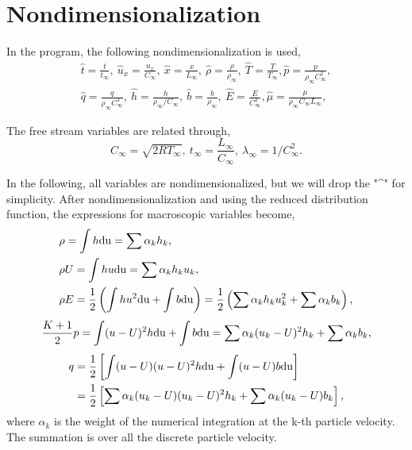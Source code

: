 \documentclass[a4paper]{book}
\begin{document}
\section{Nondimensionalization}
In the program, the following nondimensionalization is used,
\begin{gather*}
    \hat t=\frac{t}{t_\infty},\ \hat u_x=\frac{u_x}{C_\infty},\ \hat x=\frac{x}{L_\infty},\ \hat \rho=\frac{\rho}{\rho_\infty},\ \hat T=\frac{T}{T_\infty}, \hat p=\frac{p}{\rho_\infty C_\infty^2}, \\
    \hat q=\frac{q}{\rho_\infty C_\infty^3},\ \hat h=\frac{h}{\rho_\infty/C_\infty},\ \hat b=\frac{b}{\rho_\infty},\ \hat E=\frac{E}{C_\infty^2}, \hat\mu = \frac{\mu}{\rho_\infty C_\infty L_\infty},
\end{gather*}

The free stream variables are related through,
$$C_\infty=\sqrt{2RT_\infty},\ t_\infty=\frac{L_\infty}{C_\infty},\ \lambda_\infty=1/C_\infty^2.$$

In the following, all variables are nondimensionalized, but we will drop the "\textasciicircum" for simplicity. After nondimensionalization and using the reduced distribution function, the expressions for macroscopic variables become,
\begin{equation} 
    \label{eq:conserved_var}
    \begin{aligned}
        &\rho=\int h{\rm du}=\sum\alpha_k h_k,\\
        &\rho U=\int hu{\rm du}=\sum\alpha_k h_k u_k,\\
        &\rho E=\frac{1}{2}\left(\int hu^2{\rm du}+\int b{\rm du}\right)=\frac{1}{2}\left(\sum\alpha_k h_k u_k^2+\sum\alpha_k b_k\right),
    \end{aligned}
\end{equation}
\begin{equation} 
    \frac{K+1}{2}p=\int(u-U)^2h{\rm du}+\int b{\rm du}=\sum\alpha_k(u_k-U)^2 h_k+\sum\alpha_k b_k,
\end{equation}
\begin{equation} 
    \label{eq:heatflux}
    \begin{aligned}
        q&=\frac{1}{2}\left[\int(u-U)(u-U)^2h{\rm du}+\int(u-U)b{\rm du}\right]\\
         &=\frac{1}{2}\left[\sum\alpha_k (u_k-U)(u_k-U)^2 h_k+\sum\alpha_k (u_k-U)b_k\right],
    \end{aligned}
\end{equation}
where $\alpha_k$ is the weight of the numerical integration at the k-th particle velocity. The summation is over all the discrete particle velocity.
\end{document}
